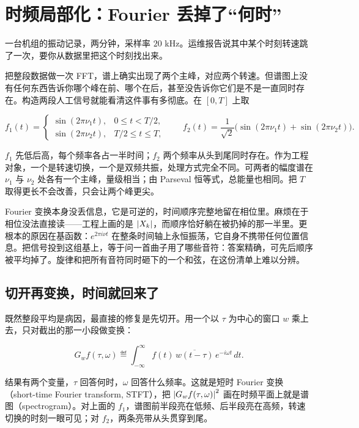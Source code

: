 \section{时频局部化：Fourier 丢掉了``何时''}
\label{sec:08-Numerical-Analysis/08-Fourier-and-Spectral-Methods/05}

一台机组的振动记录，两分钟，采样率 \(20\) kHz。运维报告说其中某个时刻转速跳了一次，要你从数据里把这个时刻找出来。

把整段数据做一次 FFT，谱上确实出现了两个主峰，对应两个转速。但谱图上没有任何东西告诉你哪个峰在前、哪个在后，甚至没告诉你它们是不是一直同时存在。构造两段人工信号就能看清这件事有多彻底。在 \([0,T]\) 上取

\[
f_1(t)=
\begin{cases}
\sin(2\pi\nu_1 t), & 0\le t<T/2,\\[2pt]
\sin(2\pi\nu_2 t), & T/2\le t\le T,
\end{cases}
\qquad
f_2(t)=\frac1{\sqrt2}\bigl(\sin(2\pi\nu_1 t)+\sin(2\pi\nu_2 t)\bigr).
\]

\(f_1\) 先低后高，每个频率各占一半时间；\(f_2\) 两个频率从头到尾同时存在。作为工程对象，一个是转速切换，一个是双频共振，处理方式完全不同。可两者的幅度谱在 \(\nu_1\) 与 \(\nu_2\) 处各有一个主峰，量级相当；由 Parseval 恒等式，总能量也相同。把 \(T\) 取得更长不会改善，只会让两个峰更尖。

Fourier 变换本身没丢信息，它是可逆的，时间顺序完整地留在相位里。麻烦在于相位没法直接读——工程上画的是 \(\left|X_k\right|\)，而顺序恰好躺在被扔掉的那一半里。更根本的原因在基函数：\(e^{2\pi i\nu t}\) 在整条时间轴上永恒振荡，它自身不携带任何位置信息。把信号投到这组基上，等于问一首曲子用了哪些音符：答案精确，可先后顺序被平均掉了。旋律和把所有音符同时砸下的一个和弦，在这份清单上难以分辨。

\subsection{切开再变换，时间就回来了}

既然整段平均是病因，最直接的修复是先切开。用一个以 \(\tau\) 为中心的窗口 \(w\) 乘上去，只对截出的那一小段做变换：

\[
G_wf(\tau,\omega)\eqdef\int_{-\infty}^{\infty}f(t)\,\overline{w(t-\tau)}\,e^{-i\omega t}\,dt .
\]

结果有两个变量，\(\tau\) 回答何时，\(\omega\) 回答什么频率。这就是短时 Fourier 变换（short-time Fourier transform, STFT），把 \(\left|G_wf(\tau,\omega)\right|^2\) 画在时频平面上就是谱图（spectrogram）。对上面的 \(f_1\)，谱图前半段亮在低频、后半段亮在高频，转速切换的时刻一眼可见；对 \(f_2\)，两条亮带从头贯穿到尾。

